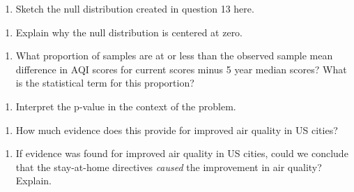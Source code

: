 \documentclass[
]{report}
\providecommand{\tightlist}{%
  \setlength{\itemsep}{0pt}\setlength{\parskip}{0pt}}
\begin{document}
\begin{enumerate}
\def\labelenumi{\arabic{enumi}.}
\setcounter{enumi}{13}
\tightlist
\item
  Sketch the null distribution created in question 13 here.
\end{enumerate}

\vspace{1.9in}

\begin{enumerate}
\def\labelenumi{\arabic{enumi}.}
\setcounter{enumi}{14}
\tightlist
\item
  Explain why the null distribution is centered at zero.
\end{enumerate}

\vspace{.5in}

\begin{enumerate}
\def\labelenumi{\arabic{enumi}.}
\setcounter{enumi}{15}
\tightlist
\item
  What proportion of samples are at or less than the observed sample mean difference in AQI scores for current scores minus 5 year median scores? What is the statistical term for this proportion?
\end{enumerate}

\vspace{.3in}

\begin{enumerate}
\def\labelenumi{\arabic{enumi}.}
\setcounter{enumi}{16}
\tightlist
\item
  Interpret the p-value in the context of the problem.
\end{enumerate}

\vspace{.8in}

\begin{enumerate}
\def\labelenumi{\arabic{enumi}.}
\setcounter{enumi}{17}
\tightlist
\item
  How much evidence does this provide for improved air quality in US cities?
\end{enumerate}

\vspace{.3in}

\begin{enumerate}
\def\labelenumi{\arabic{enumi}.}
\setcounter{enumi}{18}
\tightlist
\item
  If evidence was found for improved air quality in US cities, could we conclude that the stay-at-home directives \emph{caused} the improvement in air quality? Explain.
\end{enumerate}
\end{document}

